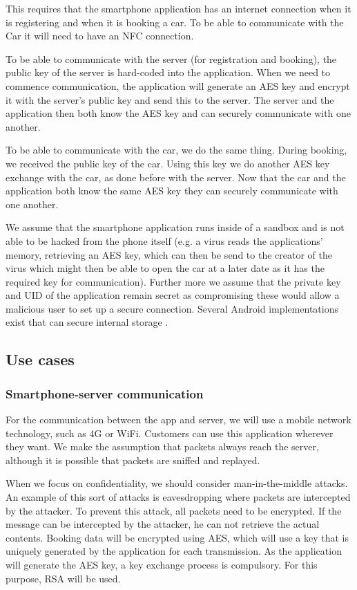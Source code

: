 \documentclass[12pt,a4paper, oneside]{article}
\newlength{\drop}
\begin{document}
This requires that the smartphone application has an internet connection when it is registering and when it is booking a car. To be able to communicate with the Car it will need to have an NFC connection.

To be able to communicate with the server (for registration and booking), the public key of the server is hard-coded into the application. When we need to commence communication, the application will generate an AES key and encrypt it with the server's public key and send this to the server. The server and the application then both know the AES key and can securely communicate with one another.

To be able to communicate with the car, we do the same thing. During booking, we received the public key of the car. Using this key we do another AES key exchange with the car, as done before with the server. Now that the car and the application both know the same AES key they can securely communicate with one another.

We assume that the smartphone application runs inside of a sandbox and is not able to be hacked from the phone itself (e.g. a virus reads the applications' memory, retrieving an AES key, which can then be send to the creator of the virus which might then be able to open the car at a later date as it has the required key for communication). Further more we assume that the private key and UID of the application remain secret as compromising these would allow a malicious user to set up a secure connection. Several Android implementations exist that can secure internal storage \cite{6341374, cooijmans2014secure}.

\subsection{Use cases}\label{sec:usecases}
\subsubsection{Smartphone-server communication}
For the communication between the app and server, we will use a mobile network technology, such as 4G or WiFi. Customers can use this application wherever they want. We make the assumption that packets always reach the server, although it is possible that packets are sniffed and replayed. 
\par
When we focus on confidentiality, we should consider man-in-the-middle attacks. An example of this sort of attacks is eavesdropping where packets are intercepted by the attacker. To prevent this attack, all packets need to be encrypted. If the message can be intercepted by the attacker, he can not retrieve the actual contents. Booking data will be encrypted using AES, which will use a key that is uniquely generated by the application for each transmission. As the application will generate the AES key, a key exchange process is compulsory. For this purpose, RSA will be used.
\end{document}
